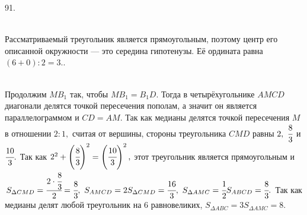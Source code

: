 \documentclass[12pt]{article}
\begin{document}
91. \begin{figure}[ht!]
\end{figure}\\
Рассматриваемый треугольник является прямоугольным, поэтому центр его описанной окружности --- это середина гипотенузы. Её ордината равна $(6+0):2=3.$\newpage{}. \begin{figure}[ht!]
\end{figure}\\
Продолжим $MB_1$ так, чтобы $MB_1=B_1D.$ Тогда в четырёхугольнике $AMCD$ диагонали делятся точкой пересечения пополам, а значит он является параллелограммом и $CD=AM.$ Так как медианы делятся точкой пересечения $M$ в отношении $2:1,$ считая от вершины, стороны треугольника $CMD$ равны $2,\ \cfrac{8}{3}$ и $\cfrac{10}{3}.$ Так как $2^2+\left(\cfrac{8}{3}\right)^2=\left(\cfrac{10}{3}\right)^2,$ этот треугольник является прямоугольным и  $S_{\Delta CMD}=\cfrac{2\cdot\cfrac{8}{3}}{2}=\cfrac{8}{3},\ S_{AMCD}=2S_{\Delta CMD}=\cfrac{16}{3},\ S_{\Delta AMC}=\cfrac{1}{2}S_{ABCD}=\cfrac{8}{3}.$ Так как медианы делят любой треугольник на 6 равновеликих, $S_{\Delta ABC}=3S_{\Delta AMC}=8.$\\
\end{document}
